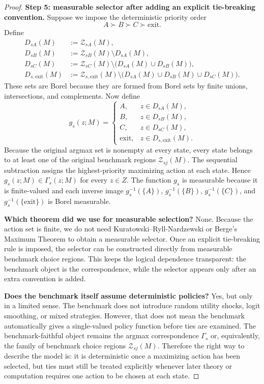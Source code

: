 \begin{proof}
\medskip\noindent\textbf{Step 5: measurable selector after adding an explicit tie-breaking convention.}
Suppose we impose the deterministic priority order
\[
A\succ B\succ C\succ \mathrm{exit}.
\]
Define
\begin{align*}
D_{sA}(M)&:=\mathcal Z_{sA}(M),\\
D_{sB}(M)&:=\mathcal Z_{sB}(M)\setminus D_{sA}(M),\\
D_{sC}(M)&:=\mathcal Z_{sC}(M)\setminus\bigl(D_{sA}(M)\cup D_{sB}(M)\bigr),\\
D_{s,\mathrm{exit}}(M)&:=\mathcal Z_{s,\mathrm{exit}}(M)\setminus\bigl(D_{sA}(M)\cup D_{sB}(M)\cup D_{sC}(M)\bigr).
\end{align*}
These sets are Borel because they are formed from Borel sets by finite unions, intersections, and complements. Now define
\[
g_s(z;M)=
\begin{cases}
A, & z\in D_{sA}(M),\\
B, & z\in D_{sB}(M),\\
C, & z\in D_{sC}(M),\\
\mathrm{exit}, & z\in D_{s,\mathrm{exit}}(M).
\end{cases}
\]
Because the original argmax set is nonempty at every state, every state belongs to at least one of the original benchmark regions $\mathcal Z_{sj}(M)$. The sequential subtraction assigns the highest-priority maximizing action at each state. Hence $g_s(z;M)\in\Gamma_s(z;M)$ for every $z\in Z$. The function $g_s$ is measurable because it is finite-valued and each inverse image $g_s^{-1}(\{A\})$, $g_s^{-1}(\{B\})$, $g_s^{-1}(\{C\})$, and $g_s^{-1}(\{\mathrm{exit}\})$ is Borel measurable.

\medskip\noindent\textbf{Which theorem did we use for measurable selection?}
None. Because the action set is finite, we do not need Kuratowski--Ryll-Nardzewski or Berge's Maximum Theorem to obtain a measurable selector. Once an explicit tie-breaking rule is imposed, the selector can be constructed directly from measurable benchmark choice regions. This keeps the logical dependence transparent: the benchmark object is the correspondence, while the selector appears only after an extra convention is added.

\medskip\noindent\textbf{Does the benchmark itself assume deterministic policies?}
Yes, but only in a limited sense. The benchmark does not introduce random utility shocks, logit smoothing, or mixed strategies. However, that does not mean the benchmark automatically gives a single-valued policy function before ties are examined. The benchmark-faithful object remains the argmax correspondence $\Gamma_s$ or, equivalently, the family of benchmark choice regions $\mathcal Z_{sj}(M)$. Therefore the right way to describe the model is: it is deterministic once a maximizing action has been selected, but ties must still be treated explicitly whenever later theory or computation requires one action to be chosen at each state.
\end{proof}

